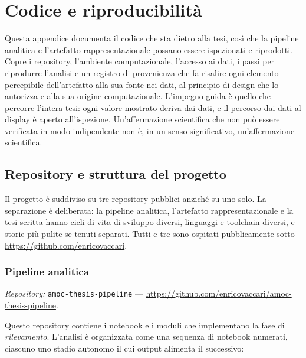 
\chapter{Codice e riproducibilità}
\label{app:code}

Questa appendice documenta il codice che sta dietro alla tesi, così che la pipeline analitica e
l'artefatto rappresentazionale possano essere ispezionati e riprodotti. Copre i repository,
l'ambiente computazionale, l'accesso ai dati, i passi per riprodurre l'analisi e un registro di
provenienza che fa risalire ogni elemento percepibile dell'artefatto alla sua fonte nei dati, al
principio di design che lo autorizza e alla sua origine computazionale. L'impegno guida è quello che
percorre l'intera tesi: ogni valore mostrato deriva dai dati, e il percorso dai dati al display è
aperto all'ispezione. Un'affermazione scientifica che non può essere verificata in modo indipendente
non è, in un senso significativo, un'affermazione scientifica.

\section{Repository e struttura del progetto}
\label{app:c-repos}

Il progetto è suddiviso su tre repository pubblici anziché su uno solo. La separazione è deliberata:
la pipeline analitica, l'artefatto rappresentazionale e la tesi scritta hanno cicli di vita di
sviluppo diversi, linguaggi e toolchain diversi, e storie più pulite se tenuti separati. Tutti e tre
sono ospitati pubblicamente sotto \url{https://github.com/enricovaccari}.

\subsection*{Pipeline analitica}
\textit{Repository:} \texttt{amoc-thesis-pipeline} ---
\url{https://github.com/enricovaccari/amoc-thesis-pipeline}.

Questo repository contiene i notebook e i moduli che implementano la fase di \emph{rilevamento}.
L'analisi è organizzata come una sequenza di notebook numerati, ciascuno uno stadio autonomo il cui
output alimenta il successivo:


